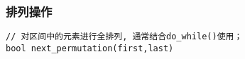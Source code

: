 \subsubsection{排列操作}
\begin{lstlisting}
// 对区间中的元素进行全排列, 通常结合do_while()使用；
bool next_permutation(first,last)
\end{lstlisting}